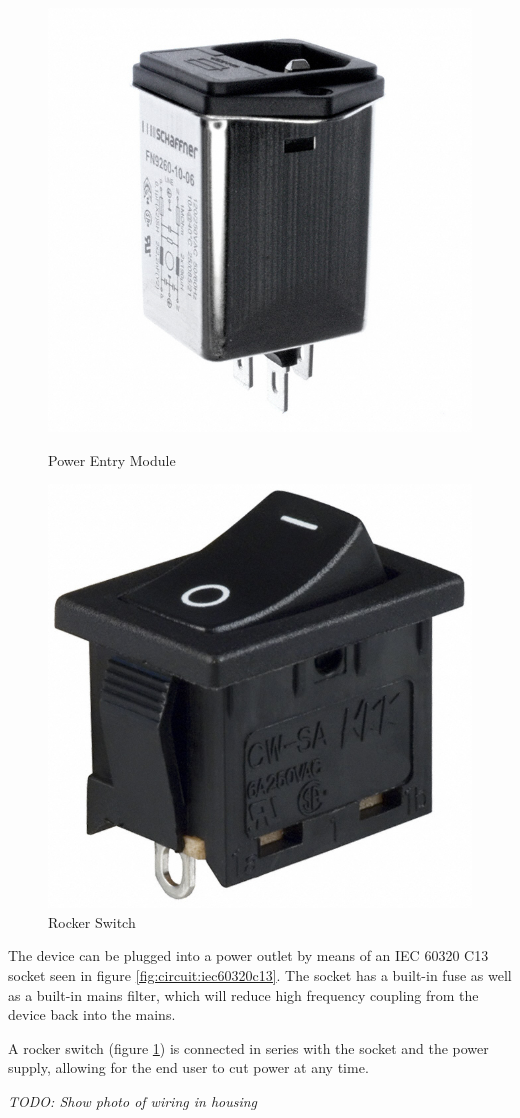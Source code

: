 \begin{figure}[th!]
\begin{minipage}{.3\textwidth}
        \includegraphics[width=.9\textwidth]{images/circuit/power-entry-module.JPG}
        \caption{Power Entry Module}
        \label{fig:circuit:iec60320c13}
    \end{minipage}
    \begin{minipage}{.3\textwidth}
        \centering
        \includegraphics[width=.6\textwidth]{images/circuit/rocker-switch.JPG}
        \caption{Rocker Switch}
        \label{fig:circuit:rocker-switch}
    \end{minipage}
\end{figure}

The  device  can be plugged into a power outlet by means of  an  IEC  60320  C13
socket seen in figure \ref{fig:circuit:iec60320c13}. The socket has a
built-in  fuse  as  well  as  a  built-in  mains  filter, which will reduce high
frequency coupling from the device back into the mains.

A rocker switch (figure \ref{fig:circuit:rocker-switch}) is  connected in series
with the socket and  the power supply, allowing for the end user to cut power at
any time.

\emph{TODO: Show photo of wiring in housing}


